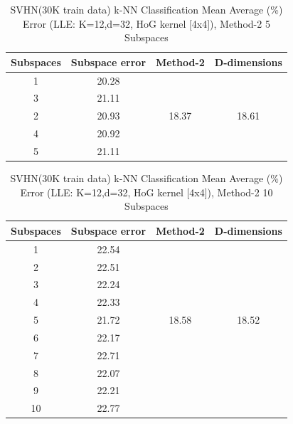 \begin{table}[H]
\centering
\label{tab:table16}
\begin{tabular}{|c|c|c|c|}
\hline
\textlatin{Subspaces} & \textlatin{Subspace error} & \textlatin{Method-2} & \textlatin{D-dimensions}  \\
\hline
1 & 20.28 & & \\
3 & 21.11 & & \\
2 & 20.93 & 18.37 & 18.61 \\
4 & 20.92 & & \\
5 & 21.11 & & \\
\hline
\end{tabular}
\caption{\textlatin{SVHN(30K train data) k-NN Classification Mean Average (\%) Error (LLE: K=12,d=32, HoG kernel [4x4]), Method-2 5 Subspaces}}
\end{table}

\begin{table}[H]
\centering
\label{tab:table17}
\begin{tabular}{|c|c|c|c|}
\hline
\textlatin{Subspaces} & \textlatin{Subspace error} & \textlatin{Method-2} & \textlatin{D-dimensions}  \\
\hline
1 & 22.54 & & \\
2 & 22.51 & & \\
3 & 22.24 & & \\
4 & 22.33 & & \\
5 & 21.72 & 18.58 & 18.52 \\
6 & 22.17 & & \\
7 & 22.71 & & \\
8 & 22.07 & & \\
9 & 22.21 & & \\
10 & 22.77 & & \\
\hline
\end{tabular}
\caption{\textlatin{SVHN(30K train data) k-NN Classification Mean Average (\%) Error (LLE: K=12,d=32, HoG kernel [4x4]), Method-2 10 Subspaces}}
\end{table}

